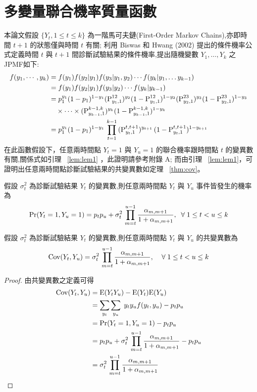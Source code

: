 \section{多變量聯合機率質量函數}
\noindent 本論文假設 $\{Y_t,1\leq t \leq k\}$ 為一階馬可夫鏈(First-Order Markov Chains),亦即時間 $t+1$ 的狀態僅與時間 $t$ 有關;
利用 Biswas 和 Hwang (2002) 提出的條件機率公式定義時間 $t$ 與 $t+1$ 間診斷試驗結果的條件機率,提出隨機變數 $Y_1,\ldots,Y_k$ 之JPMF如下:
\begin{align}\label{equ:jpmf}
    f(y_1,\cdots,y_k) &=f(y_1)f(y_2|y_1)f(y_3|y_1,y_2) \cdots f(y_k|y_1,\ldots y_{k-1}) \notag\\
                      &=f(y_1)f(y_2|y_1)f(y_3|y_2) \cdots f(y_k|y_{k-1}) \notag\\
                      &=p_1^{y_1} (1-p_1)^{1-y_1} (\mbox{P}^{12}_{y_1,1})^{y_2} (1-\mbox{P}^{12}_{y_1,1})^{1-y_2} (\mbox{P}^{23}_{y_2,1})^{y_3} (1-\mbox{P}^{23}_{y_2,1})^{1-y_3} \notag\\
                      &\quad \times \cdots \times (\mbox{P}^{k-1,k}_{y_{k-1},1})^{y_k} (1-\mbox{P}^{k-1,k}_{y_{k-1},1})^{1-y_k} \notag\\
                      &= p_1^{y_1} (1-p_1)^{1-y_1} \, \prod_{t=1}^{k-1} \, (\mbox{P}^{t,t+1}_{y_t,1})^{y_{t+1}} \, (1-\mbox{P}^{t,t+1}_{y_t,1})^{1-y_{t+1}}
\end{align}
在此函數假設下，任意兩時間點 $Y_t=1$ 與 $Y_u=1$ 的聯合機率跟時間點 $t$ 的變異數有關,關係式如引理~ \ref{lem:lem1} ，此證明請參考附錄 A; 而由引理~ \ref{lem:lem1}，可證明出任意兩時間點診斷試驗結果的共變異數如定理~ \ref{thm:cov}。
\begin{lemma}\label{lem:lem1}
假設 $\sigma_t^2$ 為診斷試驗結果 $Y_t$ 的變異數,則任意兩時間點 $Y_t$ 與 $Y_u$ 事件皆發生的機率為
$$\mbox{\textup{Pr}}(Y_t=1,Y_u=1)=p_t p_u + \sigma_t^2 \, \prod_{m=t}^{u-1} \frac{\alpha_{m,m+1}}{1+\alpha_{m,m+1}},\;\;\forall\; 1\leq t<u \leq k$$
\end{lemma}

\begin{thm}\label{thm:cov}
假設 $\sigma_t^2$ 為診斷試驗結果 $Y_t$ 的變異數,則任意兩時間點 $Y_t$ 與 $Y_u$ 的共變異數為
$$\mbox{\textup{Cov}}(Y_t,Y_u)=\sigma_t^2 \, \prod_{m=t}^{u-1} \frac{\alpha_{m,m+1}}{1+\alpha_{m,m+1}} , \;\;\;\;\forall\; 1\leq t<u \leq k$$
\end{thm}

\begin{proof}

由共變異數之定義可得
\begin{align*}
  \mbox{\textup{Cov}}(Y_t,Y_u) &= \mbox{\textup{E}}(Y_t Y_u)-\mbox{\textup{E}}(Y_t)\mbox{\textup{E}}(Y_u) \\
                      &= \sum_{y_t}\sum_{y_u}\; y_t y_u f(y_t,y_u)-p_t p_u \\
                      &= \mbox{Pr}(Y_t=1,Y_u=1) - p_t p_u \\
                      &= p_t p_u + \sigma_t^2 \, \prod_{m=t}^{u-1} \frac{\alpha_{m,m+1}}{1+\alpha_{m,m+1}}  - p_t p_u \\
                      &= \sigma_t^2 \, \prod_{m=t}^{u-1} \frac{\alpha_{m,m+1}}{1+\alpha_{m,m+1}}
\end{align*}
\end{proof}


%

